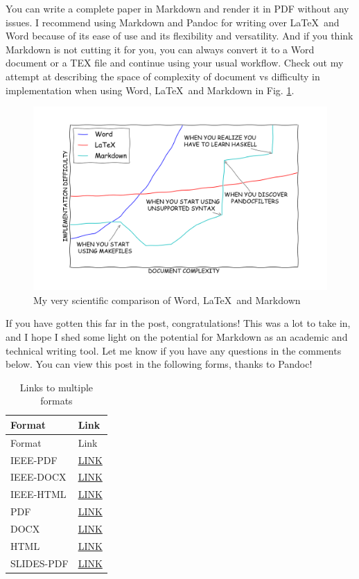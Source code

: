 \documentclass[journal,10pt,final]{IEEEtran}
\begin{document}
You can write a complete paper in Markdown and render it in PDF without
any issues. I recommend using Markdown and Pandoc for writing over
\LaTeX~and Word because of its ease of use and its flexibility and
versatility. And if you think Markdown is not cutting it for you, you
can always convert it to a Word document or a TEX file and continue
using your usual workflow. Check out my attempt at describing the space
of complexity of document vs difficulty in implementation when using
Word, \LaTeX~and Markdown in Fig. \ref{fig:learningcurve}.

\begin{figure}[htbp]
\centering
\includegraphics{../images/learningcurve.png}
\caption{My very scientific comparison of Word, \LaTeX~and
Markdown\label{fig:learningcurve}}
\end{figure}

If you have gotten this far in the post, congratulations! This was a lot
to take in, and I hope I shed some light on the potential for Markdown
as an academic and technical writing tool. Let me know if you have any
questions in the comments below. You can view this post in the following
forms, thanks to Pandoc!

\begin{longtable}[c]{@{}ll@{}}
\caption{Links to multiple formats}\tabularnewline
\toprule
Format & Link\tabularnewline
\midrule
\endfirsthead
\toprule
Format & Link\tabularnewline
\midrule
\endhead
IEEE-PDF &
\href{https://kdheepak.com/downloads/writing-papers-with-markdown.ieee.pdf}{LINK}\tabularnewline
IEEE-DOCX &
\href{https://kdheepak.com/downloads/writing-papers-with-markdown.ieee.docx}{LINK}\tabularnewline
IEEE-HTML &
\href{https://kdheepak.com/downloads/writing-papers-with-markdown.ieee.html}{LINK}\tabularnewline
PDF &
\href{https://kdheepak.com/downloads/writing-papers-with-markdown.pdf}{LINK}\tabularnewline
DOCX &
\href{https://kdheepak.com/downloads/writing-papers-with-markdown.docx}{LINK}\tabularnewline
HTML &
\href{https://kdheepak.com/downloads/writing-papers-with-markdown.html}{LINK}\tabularnewline
SLIDES-PDF &
\href{https://kdheepak.com/downloads/writing-papers-with-markdown.slides.pdf}{LINK}\tabularnewline
\bottomrule
\end{longtable}
\end{document}
